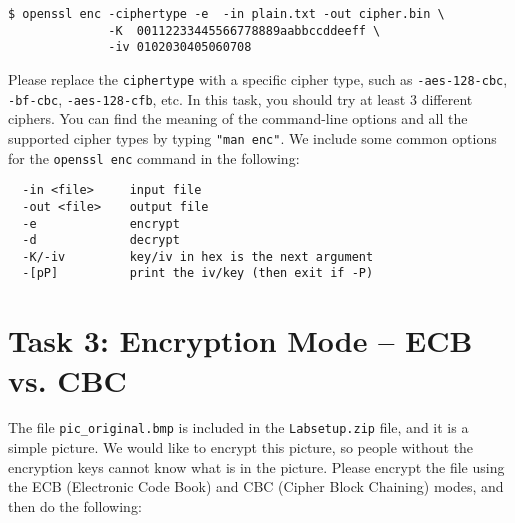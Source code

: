 \begin{lstlisting}
$ openssl enc -ciphertype -e  -in plain.txt -out cipher.bin \
              -K  00112233445566778889aabbccddeeff \
              -iv 0102030405060708
\end{lstlisting}

Please replace the {\tt ciphertype} with a specific cipher type,
such as {\tt -aes-128-cbc}, {\tt -bf-cbc}, {\tt -aes-128-cfb},
etc. In this task, you should try at least 3 different ciphers.
You can find the meaning of the
command-line options and all the supported cipher types
by typing {\tt "man enc"}.
We include some common options for the {\tt openssl enc}
command in the following:

\begin{lstlisting}
  -in <file>     input file
  -out <file>    output file
  -e             encrypt
  -d             decrypt
  -K/-iv         key/iv in hex is the next argument
  -[pP]          print the iv/key (then exit if -P)
\end{lstlisting}




\section{Task 3: Encryption Mode -- ECB vs. CBC}

The file {\tt pic\_original.bmp} is included in the
\texttt{Labsetup.zip} file, and it is a simple picture.
We would like to encrypt this picture, so people without the
encryption keys cannot know what is in the picture. Please
encrypt the file using the ECB (Electronic Code Book)
and CBC (Cipher Block Chaining) modes, and then do the following:


